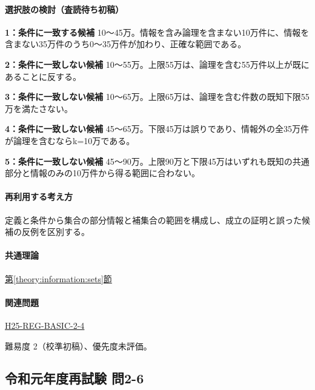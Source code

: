 \paragraph{選択肢の検討（査読待ち初稿）}\mbox{}\par

\noindent\textbf{1：条件に一致する候補} 10〜45万。情報を含み論理を含まない10万件に、情報を含まない35万件のうち0〜35万件が加わり、正確な範囲である。\par

\noindent\textbf{2：条件に一致しない候補} 10〜55万。上限55万は、論理を含む55万件以上が既にあることに反する。\par

\noindent\textbf{3：条件に一致しない候補} 10〜65万。上限65万は、論理を含む件数の既知下限55万を満たさない。\par

\noindent\textbf{4：条件に一致しない候補} 45〜65万。下限45万は誤りであり、情報外の全35万件が論理を含むならk=\allowbreak{}10万である。\par

\noindent\textbf{5：条件に一致しない候補} 45〜90万。上限90万と下限45万はいずれも既知の共通部分と情報のみの10万件から得る範囲に合わない。\par

\paragraph{再利用する考え方} 定義と条件から集合の部分情報と補集合の範囲を構成し、成立の証明と誤った候補の反例を区別する。

\paragraph{共通理論} \hyperref[theory:information:sets]{第\ref*{theory:information:sets}節}

\paragraph{関連問題} \hyperref[q:h25-reg-basic-2-4]{H25-REG-BASIC-2-4}

\par 難易度 2（校準初稿）、優先度未評価。

\subsection{令和元年度再試験 問2-6}
\label{q:r01-ret-basic-2-6}

